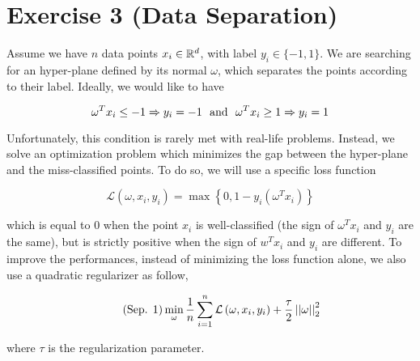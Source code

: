 \documentclass[a4paper, 11pt]{report}
\begin{document}
\section*{Exercise 3 (Data Separation)}

Assume we have $n$ data points $x_{i} \in \mathbb{R}^{d}$, with label $y_{i} \in \lbrace -1, 1 \rbrace$. We are searching for an hyper-plane defined by its normal $\omega$, which separates the points according to their label. Ideally, we would like to have

\begin{equation*}
    \omega^{T} x_{i} \leq -1 \Rightarrow y_{i} = -1 \text{\,\, and \,\,} \omega^{T} x_{i} \geq 1 \Rightarrow y_{i} = 1
\end{equation*}

\noindent Unfortunately, this condition is rarely met with real-life problems. Instead, we solve an optimization problem which minimizes the gap between the hyper-plane and the miss-classified points. To do so, we will use a specific loss function

\begin{equation*}
    \mathcal{L} \left( \omega, x_{i}, y_{i} \right) = \max \left\{ 0, 1 - y_{i} \left( \omega^{T} x_{i} \right) \right\}
\end{equation*}

\noindent which is equal to $0$ when the point $x_{i}$ is well-classified (the sign of $\omega^{T} x_{i}$ and $y_{i}$ are the same), but is strictly positive when the sign of $w^{T} x_{i}$ and $y_{i}$ are different. To improve the performances, instead of minimizing the loss function alone, we also use a quadratic regularizer as follow,

\begin{equation}
\tag{Sep. 1}
\min_{\omega} \frac{1}{n} \sum_{i=1}^{n} \mathcal{L} \left( \omega, x_{i}, y_{i} \right) + \frac{\tau}{2} \left|\left| \omega \right|\right|_{2}^{2}
\label{eq:sep-1}
\end{equation}

\noindent where $\tau$ is the regularization parameter.
\end{document}
